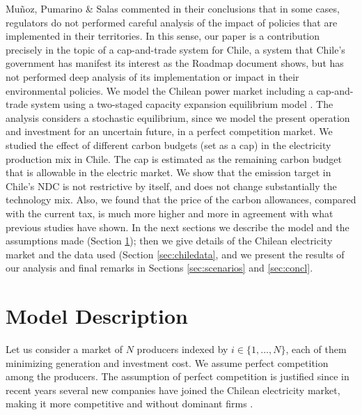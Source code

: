 \documentclass[11pt, letterpaper]{article}
\begin{document}
Mu\~{n}oz, Pumarino \& Salas \cite{munoz2017aiming} commented in their conclusions that in some cases, regulators do not performed careful analysis of the impact of policies that are implemented in their territories. In this sense, our paper is a contribution precisely in the topic of a cap-and-trade system for Chile, a system that Chile's government has manifest its interest as the Roadmap document shows, but has not performed deep analysis of its implementation or impact in their environmental policies. We model the Chilean power market including a cap-and-trade system using a two-staged capacity expansion equilibrium model \cite{ehrenmann2011stochastic}. The analysis considers a stochastic equilibrium, since we model the present operation and investment for an uncertain future, in a perfect competition market. We studied the effect of different carbon budgets (set as a cap) in the electricity production mix in Chile. The cap is estimated as the remaining carbon budget that is allowable in the electric market. We show that the emission target in Chile's NDC is not restrictive by itself, and does not change substantially the technology mix. Also, we found that the price of the carbon allowances, compared with the current tax, is much more higher and more in agreement with what previous studies have shown. In the next sections we describe the model and the assumptions made (Section \ref{sec:model}); then we give details of the Chilean electricity market and the data used (Section \ref{sec:chiledata}, and we present the results of our analysis and final remarks in Sections \ref{sec:scenarios} and \ref{sec:concl}. 





\section{Model Description}\label{sec:model}

Let us consider a market of $N$ producers indexed by $i\in\{1,...,N\}$, each of them minimizing generation and investment cost. We assume perfect competition among the producers. The assumption of perfect competition is justified since in recent years several new companies have joined the Chilean electricity market, making it more competitive and without dominant firms \cite{diaz2020equilibrium,munoz2017aiming}. 
\end{document}
